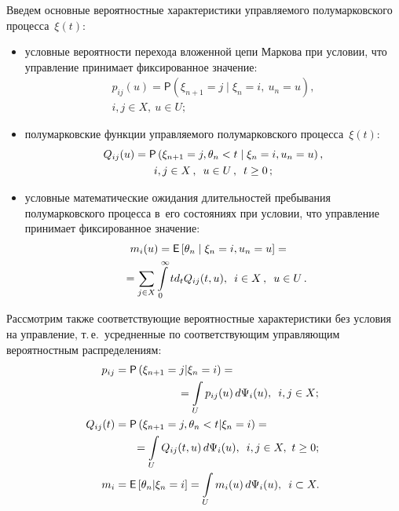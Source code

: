 \begin{multicols}{2}
Введем основные вероятностные характеристики управляемого полумарковского 
процесса~$\xi(t)$:
\begin{itemize}

\item условные вероятности перехода вложенной цепи Маркова при условии, что 
управ\-ле\-ние принимает фиксированное значение:
\begin{multline}
p_{ij}(u)=\mathsf{P}\left(\xi_{n+1}=j \mid \xi_n=i,\ u_n=u\right),\\
 i,j \in X,\ u\in U; 
\label{e1-sh}
\end{multline}
\item 
полумарковские функции управляемого полумарковского процесса~$\xi(t)$:
\begin{multline}
Q_{ij}(u)=\mathsf{P}\left(\xi_{n+1}=j, \theta_n<t \mid \xi_n=i, u_n=u\right),\\
 i,j \in X\,,\enskip u \in  U\,,\enskip t \geq 0\,;
 \label{e2-sh}
\end{multline}
\item
 условные математические ожидания длительностей пребывания полумарковского 
процесса в~его состояниях при условии, что управ\-ле\-ние принимает фиксированное 
значение:
\begin{multline}
\hspace*{-6pt}m_i(u)=\mathsf{E}\left[\theta_n \mid \xi_n=i, u_n=u\right]={}\\
{}=\sum\limits_{j \in X} 
\int\limits_0^{\infty} td_t Q_{ij}(t,u),\enskip
 i \in X\,,\enskip u \in U\,.\!\!
  \label{e3-sh}
\end{multline}
\end{itemize}

Рассмотрим также со\-от\-вет\-ст\-ву\-ющие вероятностные характеристики без условия на 
управ\-ле\-ние, т.\,е.\ усредненные по соответствующим управ\-ля\-ющим вероятностным 
распределениям:
\begin{align}
 \!\!p_{ij}&=\mathsf{P}\left(\xi_{n+1}=j|\xi_{n}=i\right)={}\notag\\
& \hspace*{20mm}{}=\int\limits_U p_{ij}(u) \,d\Psi_{i}(u),\enskip 
i,j\in X; \label{e4-sh}\\
\!\!Q_{ij}(t)&=\mathsf{P}\left(\xi_{n+1}=j,\theta_{n}<t|\xi_{n}=i\right)={}\notag\\
&\hspace*{6mm}{}=\int\limits_U  Q_{ij}(t,u)\, d\Psi_{i}(u),\enskip i,j\in X,\ t\geq0;\label{e5-sh}\\
\!\!m_{i}&=\mathsf{E}\left[ \theta_{n} |\xi_{n}=i\right] = \int\limits_U m_{i}(u) \,d\Psi_{i}(u),\enskip 
i\subset X. \!\label{e6-sh}
\end{align}


\end{multicols}
